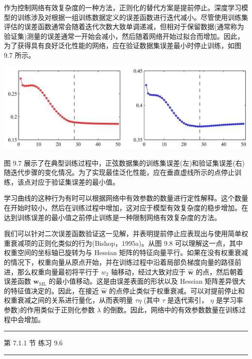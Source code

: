 \documentclass[10pt]{report}
\newcommand{\HRule}{\begin{center}\rule{0.9\linewidth}{0.2mm}\end{center}}
\begin{document}
作为控制网络有效复杂度的一种方法，正则化的替代方案是提前停止。深度学习模型的训练涉及对根据一组训练数据定义的误差函数进行迭代减小。尽管使用训练集评估的误差函数通常会随着迭代次数大致单调递减，但相对于保留数据(通常称为验证集)测量的误差通常一开始会减小，然后随着网络开始过拟合而增加。因此，为了获得具有良好泛化性能的网络，应在验证数据集误差最小时停止训练，如图 9.7 所示。

\begin{center}
\includegraphics[max width=1.0\textwidth]{images/0194e279-9b28-703a-88f4-c3ac21e2010d_286_229_366_1299_437_0.jpg}
\end{center}
\hspace*{3em} 

图 9.7 展示了在典型训练过程中，正弦数据集的训练集误差(左)和验证集误差(右)随迭代步骤的变化情况。为了实现最佳泛化性能，应在垂直虚线所示的点停止训练，该点对应于验证集误差的最小值。

学习曲线的这种行为有时可以根据网络中有效参数的数量进行定性解释。这个数量在开始时较小，然后在训练过程中增加，这对应于模型有效复杂度的稳步增加。在达到训练误差的最小值之前停止训练是一种限制网络有效复杂度的方法。

我们可以针对二次误差函数验证这一见解，并表明提前停止应表现出与使用简单权重衰减项的正则化类似的行为(Bishop，1995a)。从图 9.8 可以理解这一点，其中权重空间的坐标轴已旋转为与 Hessian 矩阵的特征向量平行。如果在没有权重衰减的情况下，权重向量从原点开始，并在训练过程中沿着局部负梯度向量的路径前进，那么权重向量最初将平行于 \({w}_{2}\) 轴移动，经过大致对应于 \(\widehat{\mathbf{w}}\) 的点，然后朝着误差函数 \({\mathbf{w}}_{\mathrm{{ML}}}\) 的最小值移动。这是由误差表面的形状以及 Hessian 矩阵差异很大的特征值决定的。因此，在接近 \(\widehat{\mathbf{w}}\) 的点停止类似于权重衰减。可以对提前停止和权重衰减之间的关系进行量化，从而表明量 \({\tau \eta }\) (其中 \(\tau\) 是迭代索引， \(\eta\) 是学习率参数)的作用类似于正则化参数 \(\lambda\) 的倒数。因此，网络中的有效参数数量在训练过程中会增加。

\HRule

第 7.1.1 节 练习 9.6

\HRule
\end{document}
